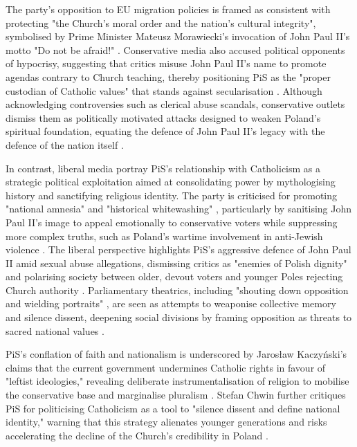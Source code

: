 The party's opposition to EU migration policies is framed as consistent with protecting "the Church's moral order and the nation's cultural integrity", symbolised by Prime Minister Mateusz Morawiecki's invocation of John Paul II's motto "Do not be afraid!" \citep{szuldrzynski_michal_2023}. Conservative media also accused political opponents of hypocrisy, suggesting that critics misuse John Paul II's name to promote agendas contrary to Church teaching, thereby positioning PiS as the "proper custodian of Catholic values" that stands against secularisation \citep{szuldrzynski_michal_2023}. Although acknowledging controversies such as clerical abuse scandals, conservative outlets dismiss them as politically motivated attacks designed to weaken Poland's spiritual foundation, equating the defence of John Paul II's legacy with the defence of the nation itself \citep{kolanko_kampania_2023}.

In contrast, liberal media portray PiS's relationship with Catholicism as a strategic political exploitation aimed at consolidating power by mythologising history and sanctifying religious identity. The party is criticised for promoting "national amnesia" and "historical whitewashing" \citep{mrozek_jak_2023}, particularly by sanitising John Paul II's image to appeal emotionally to conservative voters while suppressing more complex truths, such as Poland's wartime involvement in anti-Jewish violence \citep{mrozek_jak_2023}. The liberal perspective highlights PiS's aggressive defence of John Paul II amid sexual abuse allegations, dismissing critics as "enemies of Polish dignity" and polarising society between older, devout voters and younger Poles rejecting Church authority \citep{gadomski_awantura_2023}. Parliamentary theatrics, including "shouting down opposition and wielding portraits" \citep{wronski_sejm_2023}, are seen as attempts to weaponise collective memory and silence dissent, deepening social divisions by framing opposition as threats to sacred national values \citep{wronski_sejm_2023}.

PiS's conflation of faith and nationalism is underscored by Jarosław Kaczyński's claims that the current government undermines Catholic rights in favour of "leftist ideologies," revealing deliberate instrumentalisation of religion to mobilise the conservative base and marginalise pluralism \citep{kondzinska_pis_2023}. Stefan Chwin further critiques PiS for politicising Catholicism as a tool to "silence dissent and define national identity," warning that this strategy alienates younger generations and risks accelerating the decline of the Church's credibility in Poland \citep{chwin_stefan_2023}.

